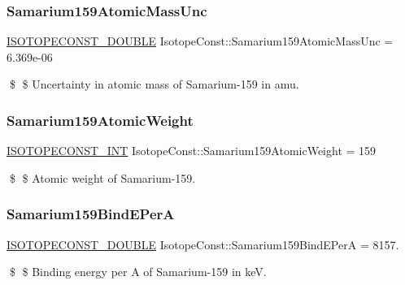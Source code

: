 \subsubsection{\texorpdfstring{Samarium159\+Atomic\+Mass\+Unc}{Samarium159AtomicMassUnc}}
{\footnotesize\ttfamily \mbox{\hyperlink{group___isotope_const-_macros_ga8f45a7272ce02c0b4c65c44636ed719a}{I\+S\+O\+T\+O\+P\+E\+C\+O\+N\+S\+T\+\_\+\+D\+O\+U\+B\+LE}} Isotope\+Const\+::\+Samarium159\+Atomic\+Mass\+Unc = 6.\+369e-\/06}

\$ \$ Uncertainty in atomic mass of Samarium-\/159 in amu. \mbox{\label{group___isotope_const-_samarium-_sm159_gae0a692ddadaf92e3f6757b9937ac39fc}} 
\subsubsection{\texorpdfstring{Samarium159\+Atomic\+Weight}{Samarium159AtomicWeight}}
{\footnotesize\ttfamily \mbox{\hyperlink{group___isotope_const-_macros_ga5f18360b3e99483a35c32d789e62621c}{I\+S\+O\+T\+O\+P\+E\+C\+O\+N\+S\+T\+\_\+\+I\+NT}} Isotope\+Const\+::\+Samarium159\+Atomic\+Weight = 159}

\$ \$ Atomic weight of Samarium-\/159. \mbox{\label{group___isotope_const-_samarium-_sm159_gabfa4f3ba64e89df17ddb99146aad18ff}} 
\subsubsection{\texorpdfstring{Samarium159\+Bind\+E\+PerA}{Samarium159BindEPerA}}
{\footnotesize\ttfamily \mbox{\hyperlink{group___isotope_const-_macros_ga8f45a7272ce02c0b4c65c44636ed719a}{I\+S\+O\+T\+O\+P\+E\+C\+O\+N\+S\+T\+\_\+\+D\+O\+U\+B\+LE}} Isotope\+Const\+::\+Samarium159\+Bind\+E\+PerA = 8157.}

\$ \$ Binding energy per A of Samarium-\/159 in keV. \mbox{\label{group___isotope_const-_samarium-_sm159_gabd68f35c8ebe755335bb7821d7a69344}} 
